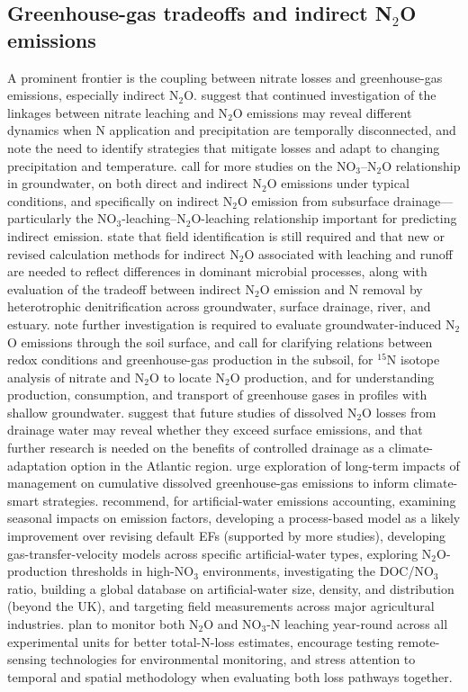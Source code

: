 \documentclass[11pt]{article}
\begin{document}
\subsection{Greenhouse-gas tradeoffs and indirect N$_2$O emissions}
A prominent frontier is the coupling between nitrate losses and greenhouse-gas emissions, especially indirect N$_2$O. \textcite{OBrien2022} suggest that continued investigation of the linkages between nitrate leaching and N$_2$O emissions may reveal different dynamics when N application and precipitation are temporally disconnected, and note the need to identify strategies that mitigate losses and adapt to changing precipitation and temperature. \textcite{Sawamoto2003} call for more studies on the NO$_3$--N$_2$O relationship in groundwater, on both direct and indirect N$_2$O emissions under typical conditions, and specifically on indirect N$_2$O emission from subsurface drainage---particularly the NO$_3$-leaching--N$_2$O-leaching relationship important for predicting indirect emission. \textcite{Minamikawa2015} state that field identification is still required and that new or revised calculation methods for indirect N$_2$O associated with leaching and runoff are needed to reflect differences in dominant microbial processes, along with evaluation of the tradeoff between indirect N$_2$O emission and N removal by heterotrophic denitrification across groundwater, surface drainage, river, and estuary. \textcite{Minamikawa2013} note further investigation is required to evaluate groundwater-induced N$_2$O emissions through the soil surface, and \textcite{Minamikawa2010} call for clarifying relations between redox conditions and greenhouse-gas production in the subsoil, for $^{15}$N isotope analysis of nitrate and N$_2$O to locate N$_2$O production, and for understanding production, consumption, and transport of greenhouse gases in profiles with shallow groundwater. \textcite{Smith2019} suggest that future studies of dissolved N$_2$O losses from drainage water may reveal whether they exceed surface emissions, and that further research is needed on the benefits of controlled drainage as a climate-adaptation option in the Atlantic region. \textcite{Oliveira2025} urge exploration of long-term impacts of management on cumulative dissolved greenhouse-gas emissions to inform climate-smart strategies. \textcite{Webb2021} recommend, for artificial-water emissions accounting, examining seasonal impacts on emission factors, developing a process-based model as a likely improvement over revising default EFs (supported by more studies), developing gas-transfer-velocity models across specific artificial-water types, exploring N$_2$O-production thresholds in high-NO$_3$ environments, investigating the DOC/NO$_3$ ratio, building a global database on artificial-water size, density, and distribution (beyond the UK), and targeting field measurements across major agricultural industries. \textcite{Fontes2019} plan to monitor both N$_2$O and NO$_3$-N leaching year-round across all experimental units for better total-N-loss estimates, encourage testing remote-sensing technologies for environmental monitoring, and stress attention to temporal and spatial methodology when evaluating both loss pathways together.
\end{document}

